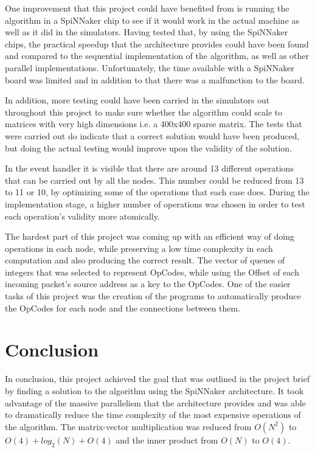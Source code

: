 \documentclass[12pt,a4paper]{article}
\begin{document}
One improvement that this project could have benefited from is running the algorithm in a SpiNNaker chip to see if it would work in the actual machine as well as it did in the simulators. Having tested that, by using the SpiNNaker chips, the practical speedup that the architecture provides could have been found and compared to the sequential implementation of the algorithm, as well as other parallel implementations. Unfortunately, the time available with a SpiNNaker board was limited and in addition to that there was a malfunction to the board.

In addition, more testing could have been carried in the simulators out throughout this project to make sure whether the algorithm could scale to matrices with very high dimensions i.e. a 400x400 sparse matrix. The tests that were carried out do indicate that a correct solution would have been produced, but doing the actual testing would improve upon the validity of the solution.

In the event handler it is visible that there are around 13 different operations that can be carried out by all the nodes. This number could be reduced from 13 to 11 or 10, by optimizing some of the operations that each case does. During the implementation stage, a higher number of operations was chosen in order to test each operation's validity more atomically.

The hardest part of this project was coming up with an efficient way of doing operations in each node, while preserving a low time complexity in each computation and also producing the correct result. The vector of queues of integers that was selected to represent OpCodes, while using the Offset of each incoming packet's source address as a key to the OpCodes. One of the easier tasks of this project was the creation of the programs to automatically produce the OpCodes for each node and the connections between them.
\section{Conclusion}
In conclusion, this project achieved the goal that was outlined in the project brief by finding a solution to the algorithm using the SpiNNaker architecture. It took advantage of the massive parallelism that the architecture provides and was able to dramatically reduce the time complexity of the most expensive operations of the algorithm. The matrix-vector multiplication was reduced from $O(N^2)$ to $O(4) + log_2(N) + O(4)$ and the inner product from $O(N)$ to $O(4)$. 
\end{document}
